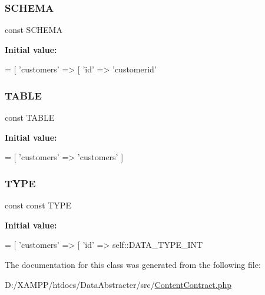 \subsubsection{\texorpdfstring{S\+C\+H\+E\+MA}{SCHEMA}}
{\footnotesize\ttfamily const S\+C\+H\+E\+MA}

{\bfseries Initial value\+:}
\begin{DoxyCode}
= [
        \textcolor{stringliteral}{'customers'} => [
            \textcolor{stringliteral}{'id'} => \textcolor{stringliteral}{'customerid'}
\end{DoxyCode}
\mbox{\label{class_david_fricker_1_1_data_abstracter_1_1_content_contract_adf62e2b172196282218b1ece3d200fa1}} 
\subsubsection{\texorpdfstring{T\+A\+B\+LE}{TABLE}}
{\footnotesize\ttfamily const T\+A\+B\+LE}

{\bfseries Initial value\+:}
\begin{DoxyCode}
= [
        \textcolor{stringliteral}{'customers'} => \textcolor{stringliteral}{'customers'}
    ]
\end{DoxyCode}
\mbox{\label{class_david_fricker_1_1_data_abstracter_1_1_content_contract_af8318499ad8c154df6f47b6df9fbb808}} 
\subsubsection{\texorpdfstring{T\+Y\+PE}{TYPE}}
{\footnotesize\ttfamily const const T\+Y\+PE}

{\bfseries Initial value\+:}
\begin{DoxyCode}
= [
         \textcolor{stringliteral}{'customers'} => [
            \textcolor{stringliteral}{'id'} => self::DATA\_TYPE\_INT
\end{DoxyCode}


The documentation for this class was generated from the following file\+:\begin{DoxyCompactItemize}
\item 
D\+:/\+X\+A\+M\+P\+P/htdocs/\+Data\+Abstracter/src/\hyperlink{_content_contract_8php}{Content\+Contract.\+php}\end{DoxyCompactItemize}
